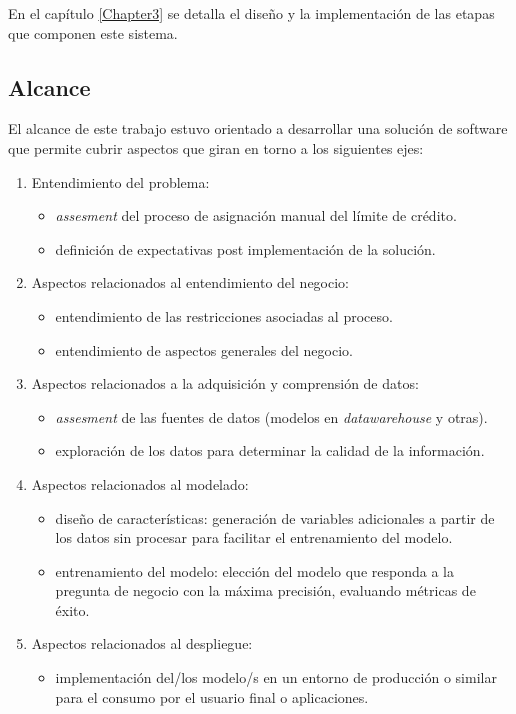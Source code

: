 En el capítulo \ref{Chapter3} se detalla el diseño y la implementación de las etapas que componen este sistema.

	
\subsection{Alcance}


El alcance de este trabajo estuvo orientado a desarrollar una solución de software que permite cubrir aspectos que giran en torno a los siguientes ejes:

\begin {enumerate}
\item Entendimiento del problema: 
	\begin {itemize}
	\item \textit{assesment} del proceso de asignación manual del límite de
crédito. 
	\item definición de expectativas post implementación de la solución.
	\end {itemize}

	
\item Aspectos relacionados al entendimiento del negocio: 
	\begin {itemize}
	\item entendimiento de las restricciones asociadas al proceso. 
	\item entendimiento de aspectos generales del negocio.
	\end {itemize}
	
\item Aspectos relacionados a la adquisición y comprensión de datos: 
	\begin {itemize}
	\item \textit{assesment} de las fuentes de datos (modelos en \textit{datawarehouse} y otras). 
	\item exploración de los datos para determinar la calidad de la información.
	\end {itemize}
	
\item Aspectos relacionados al modelado: 
	\begin {itemize}
	\item diseño de características: generación de variables adicionales a partir de los datos sin procesar para facilitar 
el entrenamiento del modelo.
	\item entrenamiento del modelo: elección del modelo que responda a la pregunta de negocio con la máxima precisión, evaluando métricas de éxito.
	\end {itemize}
	
\item Aspectos relacionados al despliegue: 
	\begin {itemize}
	\item implementación del/los modelo/s en un entorno de producción o similar para el consumo por el usuario final o aplicaciones. 
	\end {itemize}
\end {enumerate}
 
